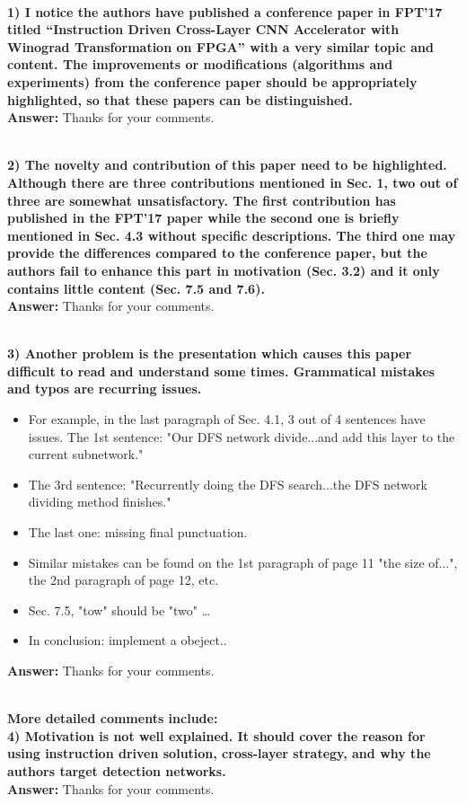 \documentclass[12pt]{paper}
\newcommand{\rev}[1]{{{\color[rgb]{0,0,1}{#1}}}}
\newcommand{\answer}[1]{\noindent\textbf{Answer:} #1}
\newcommand{\comment}[1]{\noindent\textbf{\\ #1}\\}
\begin{document}
\comment{1) I notice the authors have published a conference paper in FPT'17 titled “Instruction Driven Cross-Layer CNN Accelerator with Winograd Transformation on FPGA” with a very similar topic and content. The improvements or modifications (algorithms and experiments) from the conference paper should be appropriately highlighted, so that these papers can be distinguished.   
}
\answer{Thanks for your comments.}
\rev{We have corrected this error.}

\comment{2) The novelty and contribution of this paper need to be highlighted. Although there are three contributions mentioned in Sec. 1, two out of three are somewhat unsatisfactory. The first contribution has published in the FPT’17 paper while the second one is briefly mentioned in Sec. 4.3 without specific descriptions.  The third one may provide the differences compared to the conference paper, but the authors fail to enhance this part in motivation (Sec. 3.2) and it only contains little content (Sec. 7.5 and 7.6).  
}
\answer{Thanks for your comments.}
\rev{We have corrected this error.}


\comment{3) Another problem is the presentation which causes this paper difficult to read and understand some times. Grammatical mistakes and typos are recurring issues.
}
\begin{itemize}
    \item For example, in the last paragraph of Sec. 4.1, 3 out of 4 sentences have issues. The 1st sentence: "Our DFS network divide...and add this layer to the current subnetwork." 
\item The 3rd sentence: "Recurrently doing the DFS search...the DFS network dividing method finishes." 
\item The last one: missing final punctuation. 
\item Similar mistakes can be found on the 1st paragraph of page 11 "the size of...", the 2nd paragraph of page 12, etc. 
\item Sec. 7.5, "tow" should be "two" … 
\item In conclusion: implement a obeject.. 
    \end{itemize}
\answer{Thanks for your comments.}
\rev{We have corrected this error.}

\comment{More detailed comments include: \\
4) Motivation is not well explained. It should cover the reason for using instruction driven solution, cross-layer strategy, and why the authors target detection networks. 
}
\answer{Thanks for your comments.}
\rev{We have corrected this error.}
\end{document}
